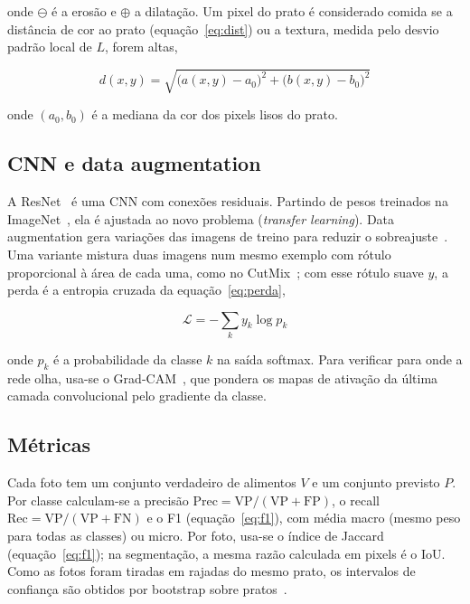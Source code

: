 \documentclass[11pt]{article}
\begin{document}
\noindent onde $\ominus$ é a erosão e $\oplus$ a dilatação. Um pixel do prato é considerado comida se a distância de cor ao prato (equação~\ref{eq:dist}) ou a textura, medida pelo desvio padrão local de $L$, forem altas,

\begin{equation} \label{eq:dist}
d(x, y) = \sqrt{\big(a(x,y) - a_0\big)^2 + \big(b(x,y) - b_0\big)^2}
\end{equation}

\noindent onde $(a_0, b_0)$ é a mediana da cor dos pixels lisos do prato.

\subsection{CNN e data augmentation}

A ResNet~\cite{he:16} é uma CNN com conexões residuais. Partindo de pesos treinados na ImageNet~\cite{deng:09}, ela é ajustada ao novo problema (\textit{transfer learning}). Data augmentation gera variações das imagens de treino para reduzir o sobreajuste~\cite{shorten:19}. Uma variante mistura duas imagens num mesmo exemplo com rótulo proporcional à área de cada uma, como no CutMix~\cite{yun:19}; com esse rótulo suave $y$, a perda é a entropia cruzada da equação~\ref{eq:perda},

\begin{equation} \label{eq:perda}
\mathcal{L} = -\sum_k y_k \log p_k
\end{equation}

\noindent onde $p_k$ é a probabilidade da classe $k$ na saída softmax. Para verificar para onde a rede olha, usa-se o Grad-CAM~\cite{selvaraju:17}, que pondera os mapas de ativação da última camada convolucional pelo gradiente da classe.

\subsection{Métricas}

Cada foto tem um conjunto verdadeiro de alimentos $V$ e um conjunto previsto $P$. Por classe calculam-se a precisão $\mathrm{Prec} = \mathrm{VP}/(\mathrm{VP}+\mathrm{FP})$, o recall $\mathrm{Rec} = \mathrm{VP}/(\mathrm{VP}+\mathrm{FN})$ e o F1 (equação~\ref{eq:f1}), com média macro (mesmo peso para todas as classes) ou micro. Por foto, usa-se o índice de Jaccard (equação~\ref{eq:f1}); na segmentação, a mesma razão calculada em pixels é o IoU. Como as fotos foram tiradas em rajadas do mesmo prato, os intervalos de confiança são obtidos por bootstrap sobre pratos~\cite{efron:93}.
\end{document}
